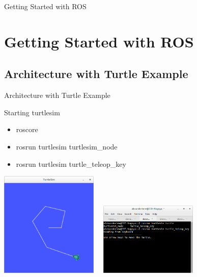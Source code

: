 \documentclass[10pt]{beamer}
\begin{document}
 \begin{frame}{}
  \begin{center}
   \LARGE Getting Started with ROS
  \end{center}
 \end{frame}
 
 \section{Getting Started with ROS}
 \subsection{Architecture with Turtle Example} 
 
 \begin{frame}{Architecture with Turtle Example}
  \begin{block}{Starting turtlesim}
   \begin{itemize}
    \item roscore
    \item rosrun turtlesim turtlesim\_node
    \item rosrun turtlesim turtle\_teleop\_key
   \end{itemize}
  \end{block}
  \begin{center}
   \includegraphics[width=0.35\textwidth]{turtlemove.png}~~
   \includegraphics[width=0.35\textwidth]{turtlecontrol.png}
  \end{center}  
 \end{frame}
 
\end{document}
